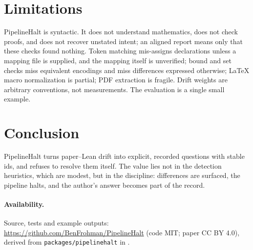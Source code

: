 \documentclass[11pt]{article}
\begin{document}
\section{Limitations}
PipelineHalt is syntactic. It does not understand mathematics, does not check proofs, and does not recover unstated intent; an aligned report means only that these checks found nothing. Token matching mis-assigns declarations unless a mapping file is supplied, and the mapping itself is unverified; bound and set checks miss equivalent encodings and miss differences expressed otherwise; LaTeX macro normalization is partial; PDF extraction is fragile. Drift weights are arbitrary conventions, not measurements. The evaluation is a single small example.

\section{Conclusion}
PipelineHalt turns paper--Lean drift into explicit, recorded questions with stable ids, and refuses to resolve them itself. The value lies not in the detection heuristics, which are modest, but in the discipline: differences are surfaced, the pipeline halts, and the author's answer becomes part of the record.

\paragraph{Availability.} Source, tests and example outputs: \url{https://github.com/BenFrohman/PipelineHalt} (code MIT; paper CC BY 4.0), derived from \texttt{packages/pipelinehalt} in \cite{frohman2026ra}.



\end{document}
